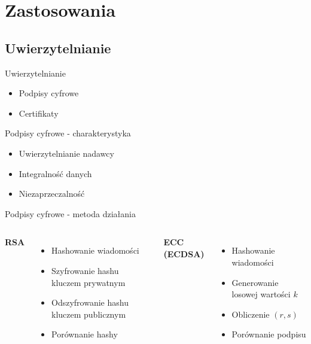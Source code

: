 \section{Zastosowania}

\subsection{Uwierzytelnianie}
\begin{frame}{Uwierzytelnianie}
    \begin{itemize}
        \pause
        \item Podpisy cyfrowe
        \pause
        \item Certifikaty
    \end{itemize}
\end{frame}

\begin{frame}{Podpisy cyfrowe - charakterystyka}
\pause
    \begin{itemize}
        \item Uwierzytelnianie nadawcy
        \pause
        \item Integralność danych
        \pause
        \item Niezaprzeczalność
    \end{itemize}
    
\end{frame}

\begin{frame}{Podpisy cyfrowe - metoda działania}
    \begin{columns}
        \textbf{RSA}
        \begin{itemize}
            \item Hashowanie wiadomości
            \item Szyfrowanie hashu kluczem prywatnym
            \item Odszyfrowanie hashu kluczem publicznym
            \item Porównanie hashy
        \end{itemize}

        \textbf{ECC (ECDSA)}
        \begin{itemize}
            \item Hashowanie wiadomości
            \item Generowanie losowej wartości $k$
            \item Obliczenie $(r, s)$
            \item Porównanie podpisu
        \end{itemize}
        \vspace{6pt}
    \end{columns}
\end{frame}

